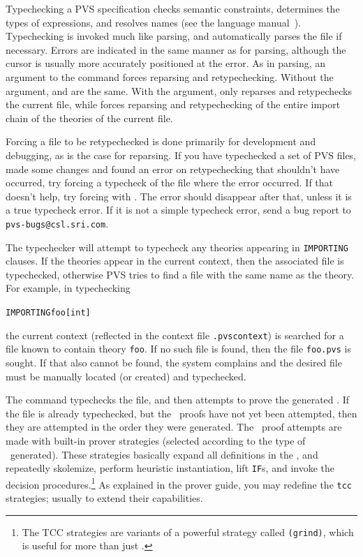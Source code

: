 Typechecking a PVS specification checks semantic constraints, determines
the types of expressions, and resolves names (see the language
manual~\cite{PVS:language}).  Typechecking is invoked
much like parsing, and automatically parses the file if necessary.  Errors
are indicated in the same manner as for parsing, although the cursor is
usually more accurately positioned at the error.  As in parsing, an
argument to the command forces reparsing and retypechecking.  Without the
argument,  and  are the same.
With the argument,  only reparses and retypechecks the
current file, while  forces reparsing and
retypechecking of the entire import chain of the theories of the current
file.

Forcing a file to be retypechecked is done primarily for development and
debugging, as is the case for reparsing.  If you have typechecked a set of
PVS files, made some changes and found an error on retypechecking that
shouldn't have occurred, try forcing a typecheck of the file where the
error occurred.  If that doesn't help, try forcing with
.  The error should disappear after that,
unless it is a true typecheck error.  If it is not a simple typecheck
error, send a bug report to \texttt{pvs-bugs@csl.sri.com}.

The typechecker will attempt to typecheck any theories
appearing in \texttt{IMPORTING} clauses.  If the theories appear in the
current context, then the associated file is typechecked, otherwise
PVS tries to find a file with the same name as the theory.  For
example, in typechecking
\begin{alltt}
  IMPORTING foo[int]
\end{alltt}
the current context (reflected in the context file \texttt{.pvscontext}) is
searched for a file known to contain theory \texttt{foo}.  If no such file is
found, then the file \texttt{foo.pvs} is sought.  If that also cannot be
found, the system complains and the desired file must be manually
located (or created) and typechecked.

The  command typechecks the file, and then attempts
to prove the generated \tccs.  If the file is already typechecked, but the
\tcc\ proofs have not yet been attempted, then they are attempted in the
order they were generated.  The \tcc\ proof attempts are made with 
built-in prover strategies (selected according to the type of \tcc\
generated). These strategies basically expand all
definitions in the \tcc, and repeatedly skolemize, perform heuristic
instantiation, lift \texttt{IF}s, and invoke the decision
procedures.\footnote{The TCC strategies are variants of a powerful
strategy called \texttt{(grind)}, which is useful for more
than just \tccs.} As explained in the prover guide, you may redefine the
\texttt{tcc} strategies; usually to extend their capabilities.

